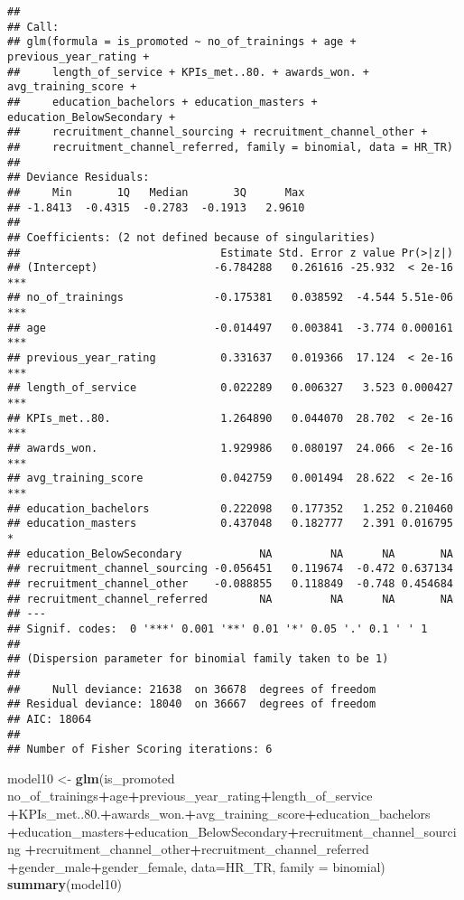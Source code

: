 \documentclass[
]{article}
\newenvironment{Shaded}{\begin{snugshade}}{\end{snugshade}}
\newcommand{\DataTypeTok}[1]{\textcolor[rgb]{0.13,0.29,0.53}{#1}}
\newcommand{\FloatTok}[1]{\textcolor[rgb]{0.00,0.00,0.81}{#1}}
\newcommand{\KeywordTok}[1]{\textcolor[rgb]{0.13,0.29,0.53}{\textbf{#1}}}
\newcommand{\NormalTok}[1]{#1}
\newcommand{\OperatorTok}[1]{\textcolor[rgb]{0.81,0.36,0.00}{\textbf{#1}}}
\newcommand{\StringTok}[1]{\textcolor[rgb]{0.31,0.60,0.02}{#1}}
\begin{document}
\begin{verbatim}
## 
## Call:
## glm(formula = is_promoted ~ no_of_trainings + age + previous_year_rating + 
##     length_of_service + KPIs_met..80. + awards_won. + avg_training_score + 
##     education_bachelors + education_masters + education_BelowSecondary + 
##     recruitment_channel_sourcing + recruitment_channel_other + 
##     recruitment_channel_referred, family = binomial, data = HR_TR)
## 
## Deviance Residuals: 
##     Min       1Q   Median       3Q      Max  
## -1.8413  -0.4315  -0.2783  -0.1913   2.9610  
## 
## Coefficients: (2 not defined because of singularities)
##                               Estimate Std. Error z value Pr(>|z|)    
## (Intercept)                  -6.784288   0.261616 -25.932  < 2e-16 ***
## no_of_trainings              -0.175381   0.038592  -4.544 5.51e-06 ***
## age                          -0.014497   0.003841  -3.774 0.000161 ***
## previous_year_rating          0.331637   0.019366  17.124  < 2e-16 ***
## length_of_service             0.022289   0.006327   3.523 0.000427 ***
## KPIs_met..80.                 1.264890   0.044070  28.702  < 2e-16 ***
## awards_won.                   1.929986   0.080197  24.066  < 2e-16 ***
## avg_training_score            0.042759   0.001494  28.622  < 2e-16 ***
## education_bachelors           0.222098   0.177352   1.252 0.210460    
## education_masters             0.437048   0.182777   2.391 0.016795 *  
## education_BelowSecondary            NA         NA      NA       NA    
## recruitment_channel_sourcing -0.056451   0.119674  -0.472 0.637134    
## recruitment_channel_other    -0.088855   0.118849  -0.748 0.454684    
## recruitment_channel_referred        NA         NA      NA       NA    
## ---
## Signif. codes:  0 '***' 0.001 '**' 0.01 '*' 0.05 '.' 0.1 ' ' 1
## 
## (Dispersion parameter for binomial family taken to be 1)
## 
##     Null deviance: 21638  on 36678  degrees of freedom
## Residual deviance: 18040  on 36667  degrees of freedom
## AIC: 18064
## 
## Number of Fisher Scoring iterations: 6
\end{verbatim}

\begin{Shaded}
\begin{Highlighting}[]
\NormalTok{model10 <-}\StringTok{ }\KeywordTok{glm}\NormalTok{(is_promoted }\OperatorTok{~}\StringTok{ }\NormalTok{no_of_trainings}\OperatorTok{+}\NormalTok{age}\OperatorTok{+}\NormalTok{previous_year_rating}\OperatorTok{+}\NormalTok{length_of_service}
              \OperatorTok{+}\NormalTok{KPIs_met..}\FloatTok{80.}\OperatorTok{+}\NormalTok{awards_won.}\OperatorTok{+}\NormalTok{avg_training_score}\OperatorTok{+}\NormalTok{education_bachelors}
              \OperatorTok{+}\NormalTok{education_masters}\OperatorTok{+}\NormalTok{education_BelowSecondary}\OperatorTok{+}\NormalTok{recruitment_channel_sourcing}
              \OperatorTok{+}\NormalTok{recruitment_channel_other}\OperatorTok{+}\NormalTok{recruitment_channel_referred}
              \OperatorTok{+}\NormalTok{gender_male}\OperatorTok{+}\NormalTok{gender_female, }
              \DataTypeTok{data=}\NormalTok{HR_TR, }\DataTypeTok{family =}\NormalTok{ binomial)}
\KeywordTok{summary}\NormalTok{(model10)}
\end{Highlighting}
\end{Shaded}
\end{document}

